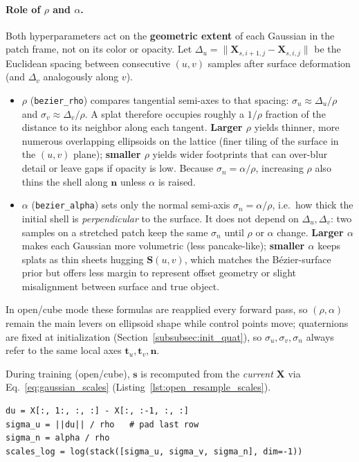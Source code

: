 \paragraph{Role of $\rho$ and $\alpha$.}
Both hyperparameters act on the \textbf{geometric extent} of each Gaussian in the patch frame, not on its color or opacity. Let $\Delta_u=\|\mathbf{X}_{s,i+1,j}-\mathbf{X}_{s,i,j}\|$ be the Euclidean spacing between consecutive $(u,v)$ samples after surface deformation (and $\Delta_v$ analogously along $v$).
\begin{itemize}
    \item $\rho$ (\texttt{bezier\_rho}) compares tangential semi-axes to that spacing: $\sigma_u\approx \Delta_u/\rho$ and $\sigma_v\approx \Delta_v/\rho$. A splat therefore occupies roughly a $1/\rho$ fraction of the distance to its neighbor along each tangent. \textbf{Larger $\rho$} yields thinner, more numerous overlapping ellipsoids on the lattice (finer tiling of the surface in the $(u,v)$ plane); \textbf{smaller $\rho$} yields wider footprints that can over-blur detail or leave gaps if opacity is low. Because $\sigma_n=\alpha/\rho$, increasing $\rho$ also thins the shell along $\mathbf{n}$ unless $\alpha$ is raised.
    \item $\alpha$ (\texttt{bezier\_alpha}) sets only the normal semi-axis $\sigma_n=\alpha/\rho$, i.e.\ how thick the initial shell is \emph{perpendicular} to the surface. It does not depend on $\Delta_u,\Delta_v$: two samples on a stretched patch keep the same $\sigma_n$ until $\rho$ or $\alpha$ change. \textbf{Larger $\alpha$} makes each Gaussian more volumetric (less pancake-like); \textbf{smaller $\alpha$} keeps splats as thin sheets hugging $\mathbf{S}(u,v)$, which matches the B\'ezier-surface prior but offers less margin to represent offset geometry or slight misalignment between surface and true object.
\end{itemize}
In open/cube mode these formulas are reapplied every forward pass, so $(\rho,\alpha)$ remain the main levers on ellipsoid shape while control points move; quaternions are fixed at initialization (Section~\ref{subsubsec:init_quat}), so $\sigma_u,\sigma_v,\sigma_n$ always refer to the same local axes $\mathbf{t}_u,\mathbf{t}_v,\mathbf{n}$.

During training (open/cube), $\mathbf{s}$ is recomputed from the \emph{current} $\mathbf{X}$ via Eq.~\eqref{eq:gaussian_scales} (Listing~\ref{lst:open_resample_scales}).

\begin{lstlisting}[caption={Log-scale recomputation in \code{\_bezier\_open\_resample\_means\_scales}.},label={lst:open_resample_scales}]
du = X[:, 1:, :, :] - X[:, :-1, :, :]
sigma_u = ||du|| / rho   # pad last row
sigma_n = alpha / rho
scales_log = log(stack([sigma_u, sigma_v, sigma_n], dim=-1))
\end{lstlisting}

